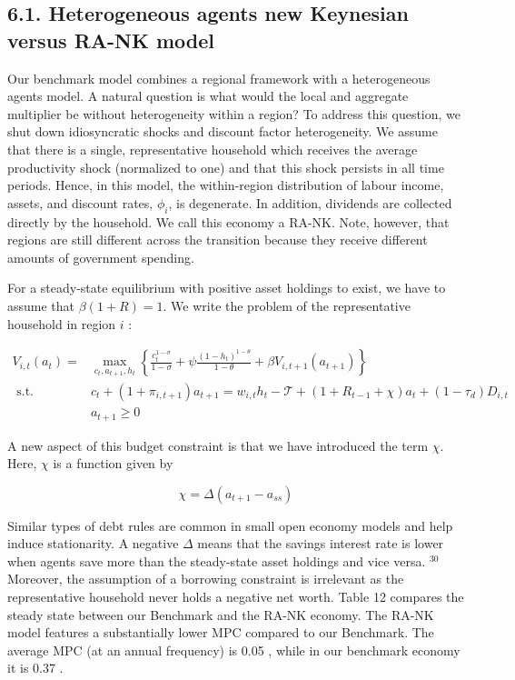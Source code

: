 \documentclass[10pt]{article}
\begin{document}
\subsection*{6.1. Heterogeneous agents new Keynesian versus RA-NK model}
Our benchmark model combines a regional framework with a heterogeneous agents model. A natural question is what would the local and aggregate multiplier be without heterogeneity within a region? To address this question, we shut down idiosyncratic shocks and discount factor heterogeneity. We assume that there is a single, representative household which receives the average productivity shock (normalized to one) and that this shock persists in all time periods. Hence, in this model, the within-region distribution of labour income, assets, and discount rates, $\phi_{i}$, is degenerate. In addition, dividends are collected directly by the household. We call this economy a RA-NK. Note, however, that regions are still different across the transition because they receive different amounts of government spending.

For a steady-state equilibrium with positive asset holdings to exist, we have to assume that $\beta(1+R)=1$. We write the problem of the representative household in region $i$ :


\begin{align*}
V_{i, t}\left(a_{t}\right)= & \max _{c_{t}, a_{t+1}, h_{t}}\left\{\frac{c_{t}^{1-\sigma}}{1-\sigma}+\psi \frac{\left(1-h_{t}\right)^{1-\theta}}{1-\theta}+\beta V_{i, t+1}\left(a_{t+1}\right)\right\}  \tag{6.1}\\
\text { s.t. } & c_{t}+\left(1+\pi_{i, t+1}\right) a_{t+1}=w_{i, t} h_{t}-\mathcal{T}+\left(1+R_{t-1}+\chi\right) a_{t}+\left(1-\tau_{d}\right) D_{i, t}  \tag{6.2}\\
& a_{t+1} \geq 0 \tag{6.3}
\end{align*}


A new aspect of this budget constraint is that we have introduced the term $\chi$. Here, $\chi$ is a function given by

$$
\chi=\Delta\left(a_{t+1}-a_{s s}\right)
$$

Similar types of debt rules are common in small open economy models and help induce stationarity. A negative $\Delta$ means that the savings interest rate is lower when agents save more than the steady-state asset holdings and vice versa. ${ }^{30}$ Moreover, the assumption of a borrowing constraint is irrelevant as the representative household never holds a negative net worth. Table 12 compares the steady state between our Benchmark and the RA-NK economy. The RA-NK model features a substantially lower MPC compared to our Benchmark. The average MPC (at an annual frequency) is 0.05 , while in our benchmark economy it is 0.37 .
\end{document}
